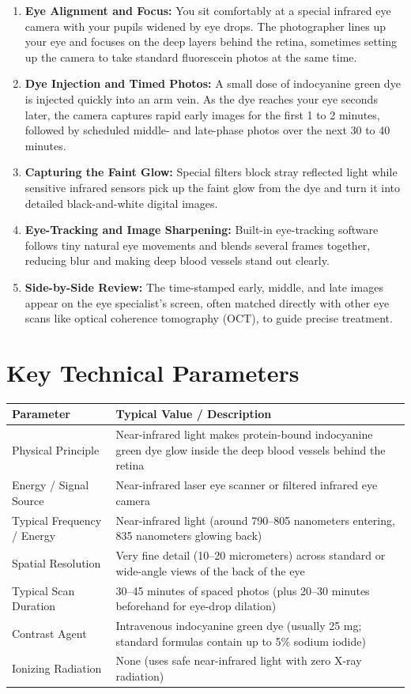 \begin{enumerate}
    \item \textbf{Eye Alignment and Focus:} You sit comfortably at a special infrared eye camera with your pupils widened by eye drops. The photographer lines up your eye and focuses on the deep layers behind the retina, sometimes setting up the camera to take standard fluorescein photos at the same time.
    \item \textbf{Dye Injection and Timed Photos:} A small dose of indocyanine green dye is injected quickly into an arm vein. As the dye reaches your eye seconds later, the camera captures rapid early images for the first 1 to 2 minutes, followed by scheduled middle- and late-phase photos over the next 30 to 40 minutes.
    \item \textbf{Capturing the Faint Glow:} Special filters block stray reflected light while sensitive infrared sensors pick up the faint glow from the dye and turn it into detailed black-and-white digital images.
    \item \textbf{Eye-Tracking and Image Sharpening:} Built-in eye-tracking software follows tiny natural eye movements and blends several frames together, reducing blur and making deep blood vessels stand out clearly.
    \item \textbf{Side-by-Side Review:} The time-stamped early, middle, and late images appear on the eye specialist's screen, often matched directly with other eye scans like optical coherence tomography (OCT), to guide precise treatment.
\end{enumerate}

\section{Key Technical Parameters}

\noindent\begin{tabularx}{\textwidth}{@{}l X@{}}
\toprule
\textbf{Parameter} & \textbf{Typical Value / Description} \\
\midrule
Physical Principle & Near-infrared light makes protein-bound indocyanine green dye glow inside the deep blood vessels behind the retina \\
Energy / Signal Source & Near-infrared laser eye scanner or filtered infrared eye camera \\
Typical Frequency / Energy & Near-infrared light (around 790--805 nanometers entering, 835 nanometers glowing back) \\
Spatial Resolution & Very fine detail (10--20 micrometers) across standard or wide-angle views of the back of the eye \\
Typical Scan Duration & 30--45 minutes of spaced photos (plus 20--30 minutes beforehand for eye-drop dilation) \\
Contrast Agent & Intravenous indocyanine green dye (usually 25 mg; standard formulas contain up to 5\% sodium iodide) \\
Ionizing Radiation & None (uses safe near-infrared light with zero X-ray radiation) \\
\bottomrule
\end{tabularx}

